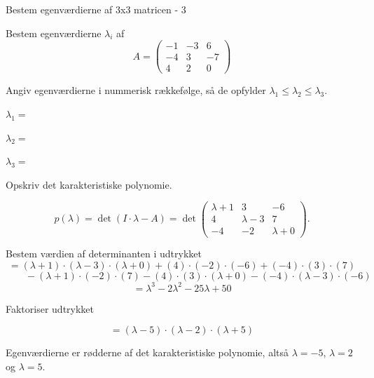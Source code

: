 \documentclass{article}
\begin{document}
\begin{exercise}{Bestem egenværdierne af 3x3 matricen - 3}

Bestem egenværdierne $\lambda_i$ af
\[
A=\begin{pmatrix}
-1 & -3 & 6 \\
-4 & 3 & -7 \\
4 & 2 & 0
\end{pmatrix}
\]

Angiv egenværdierne i nummerisk rækkefølge, så de
opfylder $\lambda_1 \le \lambda_2 \le \lambda_3$.

$\lambda_1 = $ 

$\lambda_2 = $ 

$\lambda_3 = $ 

\hint
Opskriv det karakteristiske polynomie.

\hint
\[
p(\lambda)=\det\left(I \cdot \lambda - A \right)=\det\begin{pmatrix}
\lambda + 1 & 3 & -6 \\
4 & \lambda - 3 & 7 \\
-4 & -2 & \lambda + 0
\end{pmatrix}.
\]

\hint
Bestem værdien af determinanten i udtrykket
\[
=(\lambda + 1) \cdot (\lambda - 3) \cdot (\lambda + 0)+(4) \cdot (-2) \cdot (-6)+(-4) \cdot (3) \cdot (7)
\]
\[
\qquad -(\lambda + 1) \cdot (-2) \cdot (7)-(4) \cdot (3) \cdot (\lambda + 0)-(-4) \cdot (\lambda - 3) \cdot (-6)
\]
\[
=\lambda^3 - 2\lambda^2 - 25\lambda + 50
\]

\hint
Faktoriser udtrykket

\hint
\[
=(\lambda - 5) \cdot (\lambda - 2) \cdot (\lambda + 5)
\]

\hint
Egenværdierne er rødderne af det karakteristiske polynomie,
altså
$\lambda=-5$, $\lambda=2$ og $\lambda=5$.

\end{exercise}
\end{document}
